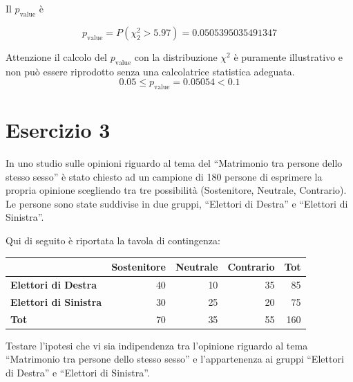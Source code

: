 \documentclass[
  11pt,
]{book}
\theoremstyle{mytheoremstyle}
\theoremstyle{mydefstyle}
\newenvironment{sol}
  {
  \begin{tcolorbox}[enhanced,breakable,arc=0.1mm,boxrule=1pt,colback=white,colframe=iblue,
  title=\bf \fontfamily{lmss}\selectfont \hspace{.5 cm} Soluzione,drop fuzzy shadow]

}{
\end{tcolorbox}
  }
\begin{document}
\begin{sol}
Il \(p_{\text{value}}\) è

\[ p_{\text{value}} = P(\chi^2_{2}>5.97)=0.0505395035491347 \]

Attenzione il calcolo del \(p_\text{value}\) con la distribuzione \(\chi^2\) è puramente illustrativo e non può essere riprodotto senza una calcolatrice statistica adeguata.\[
 0.05 \leq p_\text{value}= 0.05054 < 0.1 
\]

\end{sol}

\section{Esercizio 3}\label{esercizio-3-1}

In uno studio sulle opinioni riguardo al tema del ``Matrimonio tra persone dello stesso sesso'' è stato chiesto ad un campione di 180 persone di esprimere la propria opinione scegliendo tra tre possibilità (Sostenitore, Neutrale, Contrario). Le persone sono state suddivise in due gruppi, ``Elettori di Destra'' e ``Elettori di Sinistra''.

Qui di seguito è riportata la tavola di contingenza:

\begin{table}[H]
\centering
\begin{tabular}{>{}lrrrr}
\toprule
  & Sostenitore & Neutrale & Contrario & Tot\\
\midrule
\textbf{Elettori di Destra} & 40 & 10 & 35 & 85\\
\textbf{Elettori di Sinistra} & 30 & 25 & 20 & 75\\
\textbf{Tot} & 70 & 35 & 55 & 160\\
\bottomrule
\end{tabular}
\end{table}

Testare l'ipotesi che vi sia indipendenza tra l'opinione riguardo al tema ``Matrimonio tra persone dello stesso sesso'' e l'appartenenza ai gruppi ``Elettori di Destra'' e ``Elettori di Sinistra''.
\end{document}
